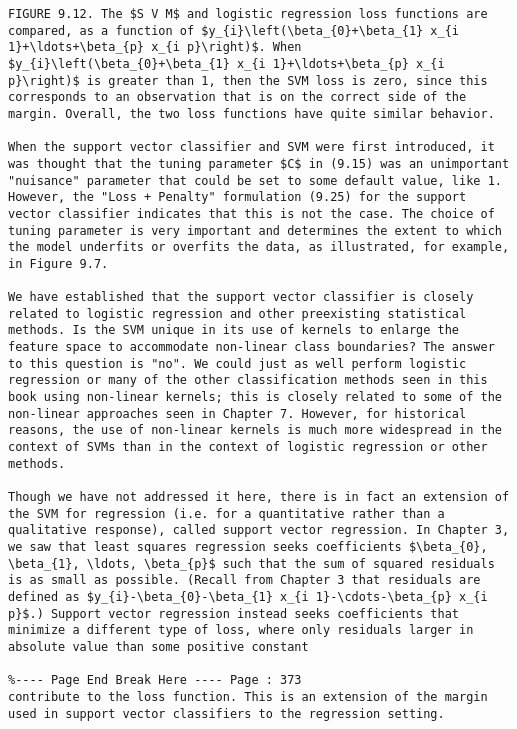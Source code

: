 \documentclass[10pt]{article}
\begin{document}
\begin{verbatim}
FIGURE 9.12. The $S V M$ and logistic regression loss functions are compared, as a function of $y_{i}\left(\beta_{0}+\beta_{1} x_{i 1}+\ldots+\beta_{p} x_{i p}\right)$. When $y_{i}\left(\beta_{0}+\beta_{1} x_{i 1}+\ldots+\beta_{p} x_{i p}\right)$ is greater than 1, then the SVM loss is zero, since this corresponds to an observation that is on the correct side of the margin. Overall, the two loss functions have quite similar behavior.

When the support vector classifier and SVM were first introduced, it was thought that the tuning parameter $C$ in (9.15) was an unimportant "nuisance" parameter that could be set to some default value, like 1. However, the "Loss + Penalty" formulation (9.25) for the support vector classifier indicates that this is not the case. The choice of tuning parameter is very important and determines the extent to which the model underfits or overfits the data, as illustrated, for example, in Figure 9.7.

We have established that the support vector classifier is closely related to logistic regression and other preexisting statistical methods. Is the SVM unique in its use of kernels to enlarge the feature space to accommodate non-linear class boundaries? The answer to this question is "no". We could just as well perform logistic regression or many of the other classification methods seen in this book using non-linear kernels; this is closely related to some of the non-linear approaches seen in Chapter 7. However, for historical reasons, the use of non-linear kernels is much more widespread in the context of SVMs than in the context of logistic regression or other methods.

Though we have not addressed it here, there is in fact an extension of the SVM for regression (i.e. for a quantitative rather than a qualitative response), called support vector regression. In Chapter 3, we saw that least squares regression seeks coefficients $\beta_{0}, \beta_{1}, \ldots, \beta_{p}$ such that the sum of squared residuals is as small as possible. (Recall from Chapter 3 that residuals are defined as $y_{i}-\beta_{0}-\beta_{1} x_{i 1}-\cdots-\beta_{p} x_{i p}$.) Support vector regression instead seeks coefficients that minimize a different type of loss, where only residuals larger in absolute value than some positive constant

%---- Page End Break Here ---- Page : 373
contribute to the loss function. This is an extension of the margin used in support vector classifiers to the regression setting.


\end{verbatim}
\end{document}
